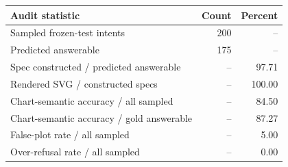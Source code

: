 \begin{tabular}{lrr}
\toprule
Audit statistic & Count & Percent \\
\midrule
Sampled frozen-test intents & 200 & -- \\
Predicted answerable & 175 & -- \\
Spec constructed / predicted answerable & -- & 97.71 \\
Rendered SVG / constructed specs & -- & 100.00 \\
Chart-semantic accuracy / all sampled & -- & 84.50 \\
Chart-semantic accuracy / gold answerable & -- & 87.27 \\
False-plot rate / all sampled & -- & 5.00 \\
Over-refusal rate / all sampled & -- & 0.00 \\
\bottomrule
\end{tabular}
